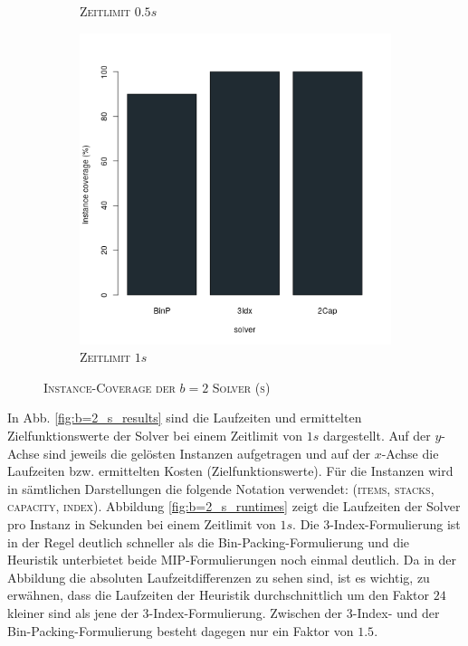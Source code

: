 \begin{figure}[H]
\begin{subfigure}[b]{0.3\textwidth}
\caption{\textsc{Zeitlimit $0.5s$}}
\label{fig:instance_cov_b=2_s_b}
\end{subfigure}
\hfill
\begin{subfigure}[b]{0.3\textwidth}
\centering
\includegraphics[width=1.2\textwidth]{img/solver_instance_coverage_b=2_s_1s.png}
\caption{\textsc{Zeitlimit $1s$}}
\label{fig:instance_cov_b=2_s_c}
\end{subfigure}

\caption{\textsc{Instance-Coverage der $b=2$ Solver (s)}}
\label{fig:instance_cov_b=2_s}
\end{figure}

In Abb. \ref{fig:b=2_s_results} sind die Laufzeiten und ermittelten Zielfunktionswerte der Solver bei einem Zeitlimit von $1s$ dargestellt. Auf der $y$-Achse sind jeweils die gelösten Instanzen aufgetragen und auf der $x$-Achse die Laufzeiten bzw. ermittelten Kosten (Zielfunktionswerte). Für die Instanzen wird in sämtlichen Darstellungen die folgende Notation verwendet: (\textsc{items, stacks, capacity, index}). Abbildung \ref{fig:b=2_s_runtimes} zeigt die Laufzeiten der Solver pro Instanz in Sekunden bei einem Zeitlimit von $1s$.
Die 3-Index-Formulierung ist in der Regel deutlich schneller als die Bin-Packing-Formulierung und die Heuristik unterbietet beide MIP-Formulierungen noch einmal deutlich. Da in der Abbildung die absoluten Laufzeitdifferenzen zu sehen sind, ist es wichtig, zu erwähnen, dass die Laufzeiten der Heuristik durchschnittlich um den Faktor $24$ kleiner sind als jene der 3-Index-Formulierung. Zwischen der 3-Index- und der Bin-Packing-Formulierung besteht dagegen nur ein Faktor von $1.5$.

